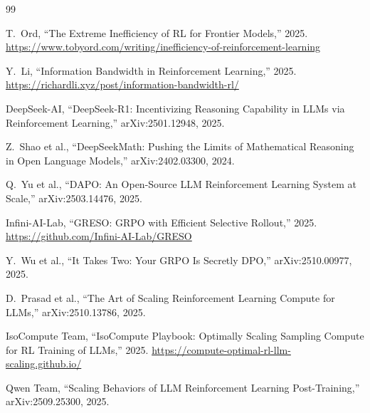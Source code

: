 \documentclass[11pt,a4paper]{article}
\theoremstyle{definition}
\theoremstyle{remark}
\begin{document}
\begin{thebibliography}{99}

T.~Ord, ``The Extreme Inefficiency of RL for Frontier Models,'' 2025.
\url{https://www.tobyord.com/writing/inefficiency-of-reinforcement-learning}

Y.~Li, ``Information Bandwidth in Reinforcement Learning,'' 2025.
\url{https://richardli.xyz/post/information-bandwidth-rl/}

DeepSeek-AI, ``DeepSeek-R1: Incentivizing Reasoning Capability in LLMs via Reinforcement Learning,'' arXiv:2501.12948, 2025.

Z.~Shao et al., ``DeepSeekMath: Pushing the Limits of Mathematical Reasoning in Open Language Models,'' arXiv:2402.03300, 2024.

Q.~Yu et al., ``DAPO: An Open-Source LLM Reinforcement Learning System at Scale,'' arXiv:2503.14476, 2025.

Infini-AI-Lab, ``GRESO: GRPO with Efficient Selective Rollout,'' 2025.
\url{https://github.com/Infini-AI-Lab/GRESO}

Y.~Wu et al., ``It Takes Two: Your GRPO Is Secretly DPO,'' arXiv:2510.00977, 2025.

D.~Prasad et al., ``The Art of Scaling Reinforcement Learning Compute for LLMs,'' arXiv:2510.13786, 2025.

IsoCompute Team, ``IsoCompute Playbook: Optimally Scaling Sampling Compute for RL Training of LLMs,'' 2025.
\url{https://compute-optimal-rl-llm-scaling.github.io/}

Qwen Team, ``Scaling Behaviors of LLM Reinforcement Learning Post-Training,'' arXiv:2509.25300, 2025.

\end{thebibliography}
\end{document}
